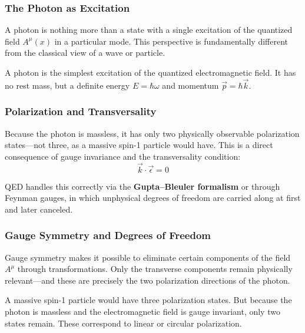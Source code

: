 \subsubsection*{The Photon as Excitation}
A photon is nothing more than a state with a single excitation of the quantized field $A^\mu(x)$ in a particular mode. This perspective is fundamentally different from the classical view of a wave or particle.

\vspace{0.5em}
\begin{tcolorbox}[physikbox, title=What Is a Photon in QED?]
	\label{box:Warum ist ein Photon in der QED}
	A photon is the simplest excitation of the quantized electromagnetic field. It has no rest mass, but a definite energy $E = \hbar \omega$ and momentum $\vec{p} = \hbar \vec{k}$.
\end{tcolorbox}

\subsubsection*{Polarization and Transversality}
Because the photon is massless, it has only two physically observable polarization states—not three, as a massive spin-1 particle would have. This is a direct consequence of gauge invariance and the transversality condition:
\[
\vec{k} \cdot \vec{\epsilon} = 0
\]

QED handles this correctly via the \textbf{Gupta–Bleuler formalism} or through Feynman gauges, in which unphysical degrees of freedom are carried along at first and later canceled.

\subsubsection*{Gauge Symmetry and Degrees of Freedom}
Gauge symmetry makes it possible to eliminate certain components of the field $A^\mu$ through transformations. Only the transverse components remain physically relevant—and these are precisely the two polarization directions of the photon.

\vspace{1em}
\begin{tcolorbox}[didaktikbox, title=Why Doesn’t the Photon Have a Spin-3 State?]
	\label{box:Warum hat das Photon keinen Spin-3-Zustand}
	A massive spin-1 particle would have three polarization states. But because the photon is massless and the electromagnetic field is gauge invariant, only two states remain. These correspond to linear or circular polarization.
\end{tcolorbox}

